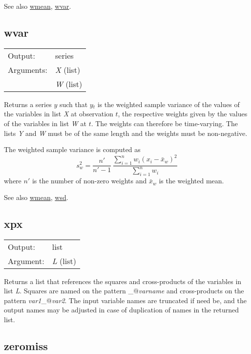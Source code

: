 	  See also \hyperlink{func-wmean}{wmean}, \hyperlink{func-wvar}{wvar}.

\subsection{wvar}
\hypertarget{func-wvar}{}

\begin{tabular}{ll}
Output:     & series\\
Arguments:  & \textsl{X} (list)\\
           & \textsl{W} (list)\\
\end{tabular}

	  Returns a series \ensuremath{y} such that \ensuremath{y}\ensuremath{_{t}}
	  is the weighted sample variance of the values of the
	  variables in list \textsl{X} at observation
	  \ensuremath{t}, the respective weights given by the values of the
	  variables in list \textsl{W} at \ensuremath{t}.  The
	  weights can therefore be time-varying. The lists
	  \textsl{Y} and \textsl{W} must be of the same
	  length and the weights must be non-negative.

	  The weighted sample variance is computed as
	  \[ s^2_w = \frac{n'}{n'-1} \,
	  \frac{\sum_{i=1}^n w_i(x_i - \bar{x}_w)^2}{\sum_{i=1}^n w_i} \]
	  where $n'$ is the number of non-zero weights and $\bar{x}_w$ is
	  the weighted mean.

	  See also \hyperlink{func-wmean}{wmean}, \hyperlink{func-wsd}{wsd}.

\subsection{xpx}
\hypertarget{func-xpx}{}

\begin{tabular}{ll}
Output:     & list\\
Argument:   & \textsl{L} (list)\\
\end{tabular}

	  Returns a list that references the squares and cross-products
	  of the variables in list \textsl{L}.  Squares are
	  named on the pattern \verb@sq_@\textsl{varname} and
	  cross-products on the pattern 
	  \textsl{var1}\verb@_@\textsl{var2}.  The input
	  variable names are truncated if need be, and the output
	  names may be adjusted in case of duplication
	  of names in the returned list.

\subsection{zeromiss}
\hypertarget{func-zeromiss}{}

